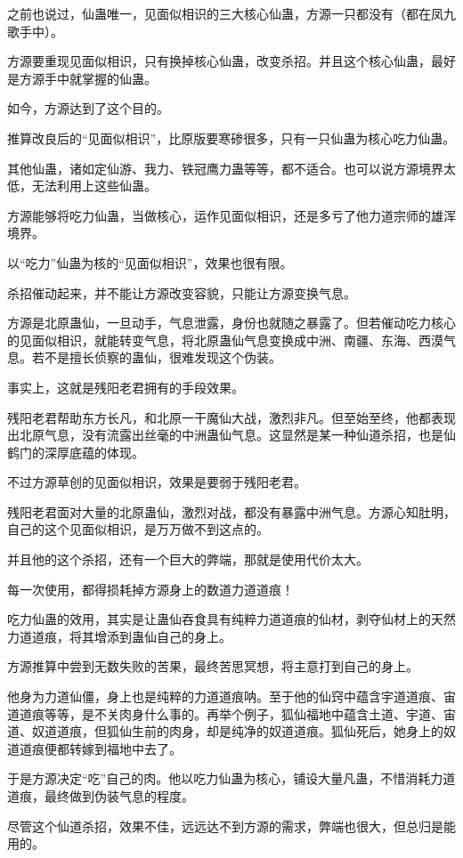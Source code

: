\begin{this_body}
之前也说过，仙蛊唯一，见面似相识的三大核心仙蛊，方源一只都没有（都在凤九歌手中）。

方源要重现见面似相识，只有换掉核心仙蛊，改变杀招。并且这个核心仙蛊，最好是方源手中就掌握的仙蛊。

如今，方源达到了这个目的。

推算改良后的“见面似相识”，比原版要寒碜很多，只有一只仙蛊为核心吃力仙蛊。

其他仙蛊，诸如定仙游、我力、铁冠鹰力蛊等等，都不适合。也可以说方源境界太低，无法利用上这些仙蛊。

方源能够将吃力仙蛊，当做核心，运作见面似相识，还是多亏了他力道宗师的雄浑境界。

以“吃力”仙蛊为核的“见面似相识”，效果也很有限。

杀招催动起来，并不能让方源改变容貌，只能让方源变换气息。

方源是北原蛊仙，一旦动手，气息泄露，身份也就随之暴露了。但若催动吃力核心的见面似相识，就能转变气息，将北原蛊仙气息变换成中洲、南疆、东海、西漠气息。若不是擅长侦察的蛊仙，很难发现这个伪装。

事实上，这就是残阳老君拥有的手段效果。

残阳老君帮助东方长凡，和北原一干魔仙大战，激烈非凡。但至始至终，他都表现出北原气息，没有流露出丝毫的中洲蛊仙气息。这显然是某一种仙道杀招，也是仙鹤门的深厚底蕴的体现。

不过方源草创的见面似相识，效果是要弱于残阳老君。

残阳老君面对大量的北原蛊仙，激烈对战，都没有暴露中洲气息。方源心知肚明，自己的这个见面似相识，是万万做不到这点的。

并且他的这个杀招，还有一个巨大的弊端，那就是使用代价太大。

每一次使用，都得损耗掉方源身上的数道力道道痕！

吃力仙蛊的效用，其实是让蛊仙吞食具有纯粹力道道痕的仙材，剥夺仙材上的天然力道道痕，将其增添到蛊仙自己的身上。

方源推算中尝到无数失败的苦果，最终苦思冥想，将主意打到自己的身上。

他身为力道仙僵，身上也是纯粹的力道道痕呐。至于他的仙窍中蕴含宇道道痕、宙道道痕等等，是不关肉身什么事的。再举个例子，狐仙福地中蕴含土道、宇道、宙道、奴道道痕，但狐仙生前的肉身，却是纯净的奴道道痕。狐仙死后，她身上的奴道道痕便都转嫁到福地中去了。

于是方源决定“吃”自己的肉。他以吃力仙蛊为核心，铺设大量凡蛊，不惜消耗力道道痕，最终做到伪装气息的程度。

尽管这个仙道杀招，效果不佳，远远达不到方源的需求，弊端也很大，但总归是能用的。


\end{this_body}
